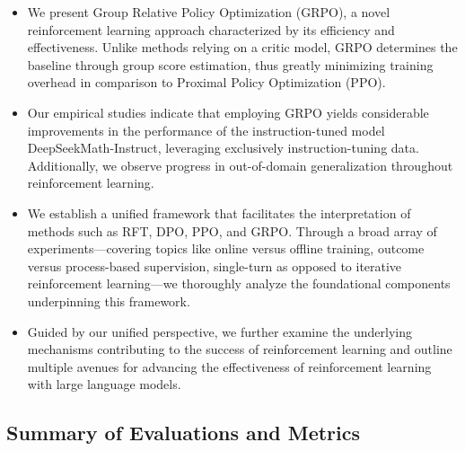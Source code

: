 \begin{itemize}[topsep=0pt]
    \item We present Group Relative Policy Optimization (GRPO), a novel reinforcement learning approach characterized by its efficiency and effectiveness. Unlike methods relying on a critic model, GRPO determines the baseline through group score estimation, thus greatly minimizing training overhead in comparison to Proximal Policy Optimization (PPO).
    \item Our empirical studies indicate that employing GRPO yields considerable improvements in the performance of the instruction-tuned model DeepSeekMath-Instruct, leveraging exclusively instruction-tuning data. Additionally, we observe progress in out-of-domain generalization throughout reinforcement learning.
    \item We establish a unified framework that facilitates the interpretation of methods such as RFT, DPO, PPO, and GRPO. Through a broad array of experiments—covering topics like online versus offline training, outcome versus process-based supervision, single-turn as opposed to iterative reinforcement learning—we thoroughly analyze the foundational components underpinning this framework.
    \item Guided by our unified perspective, we further examine the underlying mechanisms contributing to the success of reinforcement learning and outline multiple avenues for advancing the effectiveness of reinforcement learning with large language models.
\end{itemize}

\subsection{Summary of Evaluations and Metrics}

